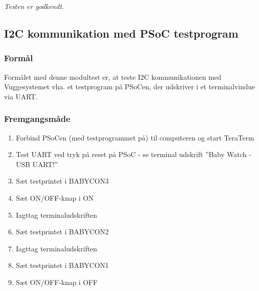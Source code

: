 


\textit{Testen er godkendt.}












\subsection*{I2C kommunikation med PSoC testprogram}

\subsubsection*{Formål}
Formålet med denne modultest er, at teste I2C kommunikationen med Vuggesystemet vha. et testprogram på PSoCen, der udskriver i et terminalvindue via UART.

\subsubsection*{Fremgangsmåde}
\begin{enumerate}
\item Forbind PSoCen (med testprogrammet på) til computeren og start TeraTerm
\item Test UART ved tryk på reset på PSoC - se terminal udskrift ''Baby Watch - USB UART!''
\item Sæt testprintet i BABYCON3
\item Sæt ON/OFF-knap i ON
\item Iagttag terminaludskriften
\item Sæt testprintet i BABYCON2 
\item Iagttag terminaludskriften
\item Sæt testprintet i BABYCON1
\item Sæt ON/OFF-knap i OFF
\end{enumerate}

